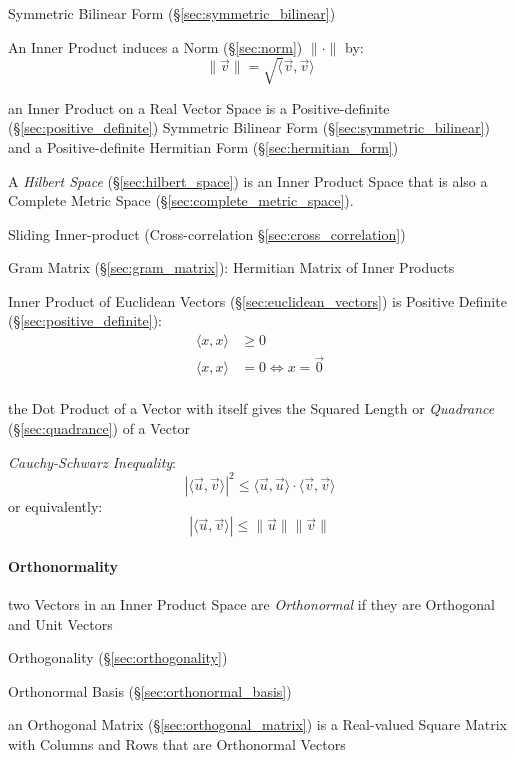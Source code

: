 Symmetric Bilinear Form (\S\ref{sec:symmetric_bilinear})

An Inner Product induces a Norm (\S\ref{sec:norm}) $\|\cdot\|$ by:
\[
  \|\vec{v}\| = \sqrt\langle{\vec{v},\vec{v}}\rangle
\]

an Inner Product on a Real Vector Space is a Positive-definite
(\S\ref{sec:positive_definite}) Symmetric Bilinear Form
(\S\ref{sec:symmetric_bilinear}) and a Positive-definite Hermitian Form
(\S\ref{sec:hermitian_form})

A \emph{Hilbert Space} (\S\ref{sec:hilbert_space}) is an Inner Product Space
that is also a Complete Metric Space (\S\ref{sec:complete_metric_space}).

\fist Sliding Inner-product (Cross-correlation \S\ref{sec:cross_correlation})

\fist Gram Matrix (\S\ref{sec:gram_matrix}): Hermitian Matrix of Inner
Products

Inner Product of Euclidean Vectors (\S\ref{sec:euclidean_vectors}) is Positive
Definite (\S\ref{sec:positive_definite}):
\begin{align*}
  \langle{x,x}\rangle & \geq 0 \\
  \langle{x,x}\rangle & =    0 \Leftrightarrow x = \vec{0} \\
\end{align*}

the Dot Product of a Vector with itself gives the Squared Length or
\emph{Quadrance} (\S\ref{sec:quadrance}) of a Vector

\emph{Cauchy-Schwarz Inequality}:
\[
  |\langle{\vec{u},\vec{v}}\rangle|^2 \leq
    \langle{\vec{u},\vec{u}}\rangle \cdot \langle{\vec{v},\vec{v}}\rangle
\]
or equivalently:
\[
  |\langle{\vec{u},\vec{v}}\rangle| \leq \|\vec{u}\| \|\vec{v}\|
\]



\paragraph{Orthonormality}\label{sec:orthonormality}\hfill

two Vectors in an Inner Product Space are \emph{Orthonormal} if they are
Orthogonal and Unit Vectors

\fist Orthogonality (\S\ref{sec:orthogonality})

\fist Orthonormal Basis (\S\ref{sec:orthonormal_basis})

an Orthogonal Matrix (\S\ref{sec:orthogonal_matrix}) is a Real-valued Square
Matrix with Columns and Rows that are Orthonormal Vectors



